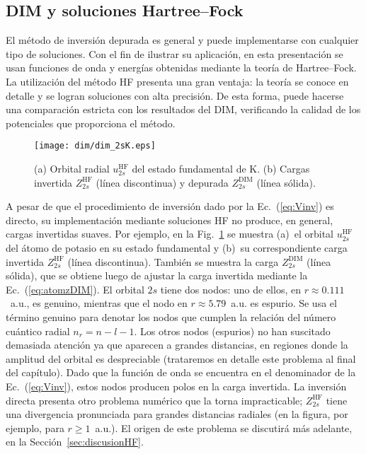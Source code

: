 \subsection{DIM y soluciones Hartree--Fock}
\label{subsec:invHF}

El método de inversión depurada es general y puede implementarse con 
cualquier tipo de soluciones. Con el fin de ilustrar su aplicación, en 
esta presentación se usan funciones de onda y energías obtenidas 
mediante la teoría de Hartree--Fock. La utilización del método HF 
presenta una gran ventaja: la teoría se conoce en detalle y se logran 
soluciones con alta precisión. De esta forma, puede hacerse una 
comparación estricta con los resultados del DIM, verificando la calidad 
de los potenciales que proporciona el método.

\begin{figure}[t]
\centering
\texttt{[image: dim/dim\_2sK.eps]} 
\caption[Orbital radial y carga efectiva correspondiente.]
{(a) Orbital radial $u_{2s}^{\mathrm{HF}}$ del estado fundamental de K.
(b) Cargas invertida $Z_{2s}^{\mathrm{HF}}$ (línea discontinua) 
y depurada $Z_{2s}^{\mathrm{DIM}}$ (línea sólida).}
\label{fig:2sK}
\end{figure}

A pesar de que el procedimiento de inversión dado por la 
Ec.~(\ref{eq:Vinv}) es directo, su implementación mediante soluciones HF 
no produce, en general, cargas invertidas suaves. Por ejemplo, en la 
Fig.~\ref{fig:2sK} se muestra (a)~el orbital $u_{2s}^{\mathrm{HF}}$ del 
átomo de potasio en su estado fundamental y (b)~su correspondiente carga 
invertida $Z_{2s}^{\mathrm{HF}}$ (línea discontinua). También se muestra 
la carga $Z_{2s}^{\mathrm{DIM}}$ (línea sólida), que se obtiene luego de 
ajustar la carga invertida mediante la Ec.~(\ref{eq:atomzDIM}). El 
orbital $2s$ tiene dos nodos: uno de ellos, en $r\approx 0.111$~a.u., es
genuino, mientras que el nodo en \mbox{$r\approx 5.79$~a.u.} es espurio. 
Se usa el término genuino para denotar los nodos que cumplen la relación 
del número cuántico radial $n_r=n-l-1$. Los otros nodos (espurios) no 
han suscitado demasiada atención ya que aparecen a grandes distancias, 
en regiones donde la amplitud del orbital es despreciable (trataremos en 
detalle este problema al final del capítulo). Dado que la función de 
onda se encuentra en el denominador de la Ec.~(\ref{eq:Vinv}), estos 
nodos producen polos en la carga invertida. La inversión directa 
presenta otro problema numérico que la torna impracticable; 
$Z_{2s}^{\mathrm{HF}}$ tiene una divergencia pronunciada para grandes 
distancias radiales (en la figura, por ejemplo, para $r\geq 1$~a.u.). El 
origen de este problema se discutirá más adelante, en la 
Sección~\ref{sec:discusionHF}. 

